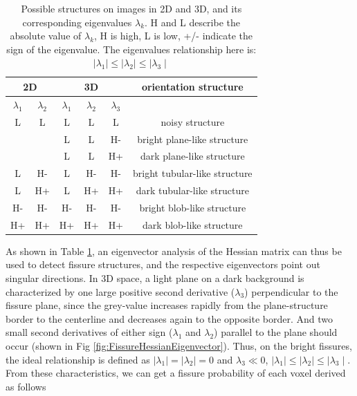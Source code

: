 {\begin{table}[h]
\centering
\caption{Possible structures on images in 2D and 3D, and its corresponding eigenvalues $\lambda_k$. H and L describe the absolute value of $\lambda_k$, H is high, L is low, +/- indicate the sign of the eigenvalue. The eigenvalues relationship here is: $\mid\lambda_{1}\mid\leq\mid\lambda_{2}\mid\leq\mid\lambda_{3}\mid$}
\label{tab:Hessian-based eigenvalue analysis}
\begin{tabular}{c c | c c c | c}
\hline
\multicolumn{2}{c|}{\bf{2D}} & \multicolumn{3}{c|}{\bf{3D}} & \bf{orientation structure}\\ 
\hline
$\lambda_1$ & $\lambda_2$ &  $\lambda_1$ & $\lambda_2$ & $\lambda_3$ &  \\
\hline
   L      &     L     &      L     &     L     &      L     & noisy structure \\
          &           &      L     &     L     &      H-    & bright plane-like structure \\
          &           &      L     &     L     &      H+    & dark plane-like structure \\
   L      &     H-    &      L     &     H-    &      H-    & bright tubular-like structure \\
   L      &     H+    &      L     &     H+    &      H+    & dark tubular-like structure \\
   H-     &     H-    &      H-    &     H-    &      H-    & bright blob-like structure \\	
   H+     &     H+    &      H+    &     H+    &      H+    & dark blob-like structure \\												
\hline
\end{tabular}
\end{table}

As shown in Table \ref{tab:Hessian-based eigenvalue analysis}, an eigenvector analysis of the Hessian matrix can thus be used to detect fissure structures, and the respective eigenvectors point out singular directions. In 3D space, a light plane on a dark background is characterized by one large positive second derivative ($\lambda_3$) perpendicular to the fissure plane, since the grey-value increases rapidly from the plane-structure border to the centerline and decreases again to the opposite border. And two small second derivatives of either sign ($\lambda_1$ and $\lambda_2$) parallel to the plane should occur (shown in Fig \ref{fig:FissureHessianEigenvector}). Thus, on the bright fissures, the ideal relationship is defined as $\mid\lambda_{1}\mid = \mid\lambda_{2}\mid = 0$ and $\lambda_{3} \ll 0$, $\mid\lambda_{1}\mid\leq\mid\lambda_{2}\mid\leq\mid\lambda_{3}\mid$. From these characteristics, we can get a fissure probability of each voxel derived as follows

}

